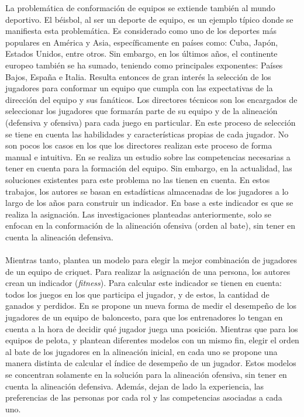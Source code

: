 La problemática de conformación de equipos se extiende también al mundo deportivo. El béisbol, al ser un deporte de equipo, es un ejemplo típico donde se manifiesta esta problemática. Es considerado como uno de los deportes más populares en América y Asia, específicamente en países como: Cuba, Japón, Estados Unidos, entre otros. Sin embargo, en los últimos años, el continente europeo también se ha sumado, teniendo como principales exponentes: Países Bajos, España e Italia. Resulta entonces de gran interés la selección de los jugadores para conformar un equipo que cumpla con las expectativas de la dirección del equipo y sus fanáticos. Los directores técnicos son los encargados de seleccionar los jugadores que formarán parte de su equipo y de la alineación (defensiva y ofensiva) para cada juego en particular. En este proceso de selección se tiene en cuenta las habilidades y características propias de cada jugador. No son pocos los casos en los que los directores realizan este proceso de forma manual e intuitiva. En \cite{Smith1995} se realiza un estudio sobre las competencias necesarias a tener en cuenta para la formación del equipo. Sin embargo, en la actualidad, las soluciones existentes para este problema \citep{Polyashuk2015, Sugrue2007} no las tienen en cuenta. En estos trabajos, los autores se basan en estadísticas almacenadas de los jugadores a lo largo de los años para construir un indicador. En base a este indicador es que se realiza la asignación. Las investigaciones planteadas anteriormente, solo se enfocan en la conformación de la alineación ofensiva (orden al bate), sin tener en cuenta la alineación defensiva.  \\\\


Mientras tanto, \cite{Burney2012} plantea un modelo para elegir la mejor combinación de jugadores de un equipo de criquet. Para realizar la asignación de una persona, los autores crean un indicador (\textit{fitness}). Para calcular este indicador se tienen en cuenta: todos los juegos en los que participa el jugador, y de estos, la cantidad de ganados y perdidos. En \cite{Cooper2009} se propone un nueva forma de medir el desempeño de los jugadores de un equipo de baloncesto, para que los entrenadores lo tengan en cuenta a la hora de decidir qué jugador juega una posición. Mientras que para los equipos de pelota, \cite{Polyashuk2015} y \cite{Sugrue2007} plantean diferentes modelos con un mismo fin, elegir el orden al bate de los jugadores en la alineación inicial, en cada uno se propone una manera distinta de calcular el índice de desempeño de un jugador. Estos modelos se concentran solamente en la solución para la alineación ofensiva, sin tener en cuenta la alineación defensiva. Además, dejan de lado la experiencia, las preferencias de las personas por cada rol y las competencias asociadas a cada uno.\\\\


